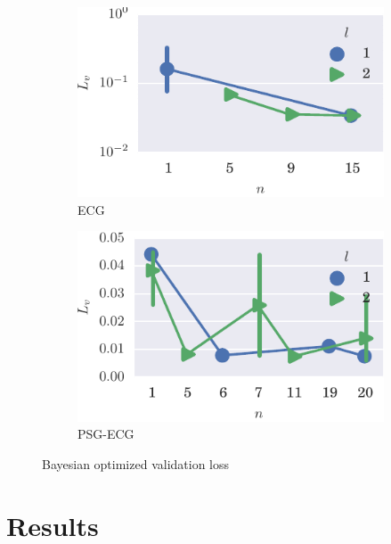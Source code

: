\begin{figure}
    \ContinuedFloat %

    \begin{subfigure}[t]{\textwidth} 
        \centering
        \includegraphics[]{figs/bo_ecg.pdf}
        \caption{ECG}
    \end{subfigure}%

    \begin{subfigure}[t]{\textwidth} 
        \centering
        \includegraphics[]{figs/bo_sleep.pdf}
        \caption{PSG-ECG}
    \end{subfigure}%

\label{fig:bo}
\caption{Bayesian optimized validation loss} %
\end{figure}


\section{Results}
\label{sec:results}



